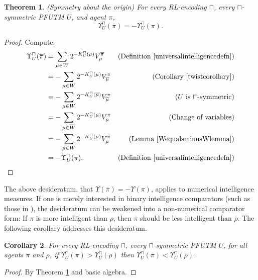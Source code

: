 \documentclass{article}
\newtheorem{theorem}{Theorem}
\newtheorem{corollary}[theorem]{Corollary}
\def\LH{\Upsilon}
\begin{document}
\begin{theorem}
\label{maintheorem}
(Symmetry about the origin)
    For every RL-encoding $\sqcap$,
    every $\sqcap$-symmetric PFUTM $U$, and agent $\pi$,
    \[
        \LH^\sqcap_U(\overline\pi) = -\LH^\sqcap_U(\pi).
    \]
\end{theorem}

\begin{proof}
    Compute:
    \begin{align*}
        \LH^\sqcap_U(\overline\pi) &= \sum_{\mu\in W} 2^{-K^\sqcap_U(\mu)}V^{\overline\pi}_\mu
            &\mbox{(Definition \ref{universalintelligencedefn})}\\
          &= -\sum_{\mu\in W} 2^{-K^\sqcap_U(\mu)}V^\pi_{\overline\mu}
            &\mbox{(Corollary \ref{twistcorollary})}\\
          &= -\sum_{\mu\in W} 2^{-K^\sqcap_U(\overline\mu)}V^\pi_{\overline\mu}
            &\mbox{($U$ is $\sqcap$-symmetric)}\\
          &= -\sum_{\mu\in \overline W} 2^{-K^\sqcap_U(\mu)}V^\pi_\mu
            &\mbox{(Change of variables)}\\
          &= -\sum_{\mu\in W} 2^{-K^\sqcap_U(\mu)}V^\pi_\mu
            &\mbox{(Lemma \ref{WequalsminusWlemma})}\\
          &= -\LH^\sqcap_{U}(\pi).
            &\mbox{(Definition \ref{universalintelligencedefn})}
    \end{align*}
\end{proof}

The above desideratum, that $\Upsilon(\overline\pi)=-\Upsilon(\pi)$, applies to
numerical intelligence measures. If one is merely interested in binary
intelligence comparators (such as those in \cite{alexander2019intelligence}),
the desideratum can be weakened into a non-numerical comparator form:
    If $\pi$ is more intelligent than $\rho$,
    then $\overline\pi$ should be less intelligent than $\overline\rho$.
The following corollary addresses this desideratum.

\begin{corollary}
\label{comparatorcorollary}
    For every RL-encoding $\sqcap$, every $\sqcap$-symmetric PFUTM $U$,
    for all agents $\pi$ and $\rho$, if $\LH^\sqcap_U(\pi)>\LH^\sqcap_U(\rho)$
    then $\LH^\sqcap_U(\overline\pi)<\LH^\sqcap_U(\overline\rho)$.
\end{corollary}

\begin{proof}
    By Theorem \ref{maintheorem} and basic algebra.
\end{proof}
\end{document}
